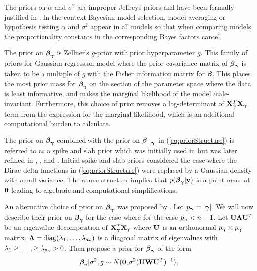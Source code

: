 \documentclass{article}[12pt]
\begin{document}
The priors on $\alpha$ and $\sigma^2$ are improper Jeffreys priors and have been formally justified 
in \cite{Berger2012}. In the context Bayesian model selection, model averaging or hypothesis 
testing $\alpha$ and $\sigma^2$ appear in all models 
so that when comparing models the proportionality constants in the corresponding
Bayes factors cancel.

The prior on ${\boldsymbol \beta}_{\boldsymbol \gamma}$ is Zellner's $g$-prior \citep[see for example,][]{Zellner1986} with prior 
hyperparameter $g$. This family of priors for Gaussian regression model where the prior covariance 
matrix of ${\boldsymbol \beta}_{\boldsymbol \gamma}$ is taken to be a multiple of $g$ with the Fisher information matrix for ${\boldsymbol \beta}$. 
This places the most prior mass for ${\boldsymbol \beta}_{\boldsymbol \gamma}$ on the section of the parameter space where the data is 
least informative, and makes the marginal likelihood of the model scale-invariant. Furthermore, this 
choice of prior removes a log-determinant of ${\bf X}_{\boldsymbol \gamma}^T{\bf X}_{\boldsymbol \gamma}$ term from the expression for the marginal 
likelihood, which is an additional computational burden to calculate.

The prior on ${\boldsymbol \beta}_{\boldsymbol \gamma}$ combined with the prior on ${\boldsymbol \beta}_{-{\boldsymbol \gamma}}$
in (\ref{eq:priorStructure}) is referred to as a spike and slab prior
which was initially used in
\cite{Mitchell1988}
but was later refined in
\cite{Madigan1994},
\cite{George1993}, and
\cite{Ishwaran2005}. 
Initial  spike and slab priors considered the 
case where the Dirac delta functions in (\ref{eq:priorStructure}) 
were replaced
by a Gaussian density with small variance. The above structure implies 
that $p({\boldsymbol \beta}_{\boldsymbol \gamma}|{\bf y})$ is a point mass at ${\bf 0}$ leading to
algebraic and computational simplifications. 

An alternative choice of prior on ${\boldsymbol \beta}_{\boldsymbol \gamma}$ was proposed by \cite{Maruyama2011}. Let
$p_{{\boldsymbol \gamma}} = |{\boldsymbol \gamma}|$. We will now describe their prior on ${\boldsymbol \beta}_{\boldsymbol \gamma}$ for the case where for the case
$p_{{\boldsymbol \gamma}} < n - 1$. Let ${\bf U}{\boldsymbol \Lambda}{\bf U}^T$ be an eigenvalue decomposition of ${\bf X}_{\boldsymbol \gamma}^T{\bf X}_{\boldsymbol \gamma}$
where ${\bf U}$ is an orthonormal $p_{{\boldsymbol \gamma}} \times p_{{\boldsymbol \gamma}}$ matrix, ${\boldsymbol \Lambda} = \mbox{diag}(\lambda_1,\ldots,\lambda_{p_{{\boldsymbol \gamma}}})$ 
is a diagonal matrix of eigenvalues with $\lambda_1\ge\ldots,\ge \lambda_{p_{{\boldsymbol \gamma}}}>0$. Then \cite{Maruyama2011} 
propose a prior for ${\boldsymbol \beta}_{\boldsymbol \gamma}$ of the form
\begin{equation}
\label{eq:priorBetaMG}
{\boldsymbol\beta}_{\boldsymbol \gamma} | \sigma^2, g \sim N({\bf 0}, \sigma^2 ({\bf U}{\bf W}{\bf U}^T)^{-1}),   
\end{equation} 
\end{document}

